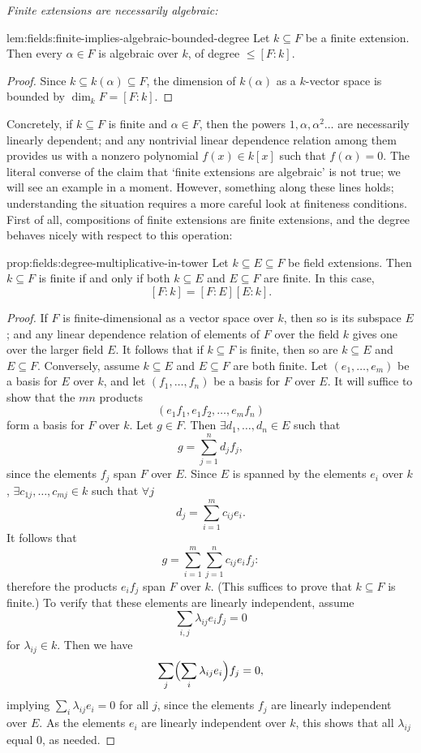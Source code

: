 \emph{Finite extensions are necessarily algebraic:}
\begin{lem}{}{lem:fields:finite-implies-algebraic-bounded-degree}
  Let $k \subseteq F$ be a finite extension. Then every $\alpha \in F$
  is algebraic over $k$, of degree $\leq [F : k]$.
\end{lem}
\begin{proof}
  Since $k \subseteq k(\alpha) \subseteq F$, the dimension of
  $k(\alpha)$ as a $k$-vector space is bounded by
  $\dim_k F = [F : k]$.
\end{proof}
Concretely, if $k \subseteq F$ is finite and $\alpha \in F$, then the
powers $1, \alpha, \alpha^2 \dots$ are necessarily linearly dependent;
and any nontrivial linear dependence relation among them provides us
with a nonzero polynomial $f(x) \in k[x]$ such that $f(\alpha) = 0$.
The literal converse of the claim that `finite extensions are
algebraic' is not true; we will see an example in a moment. However,
something along these lines holds; understanding the situation
requires a more careful look at finiteness conditions.  First of all,
compositions of finite extensions are finite extensions, and the
degree behaves nicely with respect to this operation:
\begin{prop}{}{prop:fields:degree-multiplicative-in-tower}
  Let $k \subseteq E \subseteq F$ be field extensions. Then
  $k \subseteq F$ is finite if and only if both $k \subseteq E$ and
  $E \subseteq F$ are finite.  In this case,
  \[ [F : k] = [F : E][E : k].
  \]
\end{prop}
\begin{proof}
  If $F$ is finite-dimensional as a vector space over $k$, then so is
  its subspace $E$; and any linear dependence relation of elements of
  $F$ over the field $k$ gives one over the larger field $E$. It
  follows that if $k \subseteq F$ is finite, then so are
  $k \subseteq E$ and $E \subseteq F$.  Conversely, assume
  $k \subseteq E$ and $E \subseteq F$ are both finite. Let
  $(e_1, \dots, e_m)$ be a basis for $E$ over $k$, and let
  $(f_1, \dots, f_n)$ be a basis for $F$ over $E$. It will suffice to
  show that the $mn$ products
  \[
    (e_1 f_1, e_1 f_2, \dots, e_m f_n)
  \]
  form a basis for $F$ over $k$.  Let $g \in F$. Then
  $\exists d_1, \dots, d_n \in E$ such that
  \[
    g = \sum_{j=1}^{n} d_j f_j,
  \]
  since the elements $f_j$ span $F$ over $E$. Since $E$ is spanned by
  the elements $e_i$ over $k$, $\exists c_{1j}, \dots, c_{mj} \in k$
  such that $\forall j$
  \[
    d_j = \sum_{i=1}^{m} c_{ij} e_i.
  \]
  It follows that
  \[
    g = \sum_{i=1}^{m} \sum_{j=1}^{n} c_{ij} e_i f_j:
  \]
  therefore the products $e_i f_j$ span $F$ over $k$. (This suffices
  to prove that $k \subseteq F$ is finite.)  To verify that these
  elements are linearly independent, assume
  \[
    \sum_{i,j} \lambda_{ij} e_i f_j = 0
  \]
  for $\lambda_{ij} \in k$. Then we have
  \[
    \sum_{j} \Bigl(\sum_{i} \lambda_{ij} e_i\Bigr) f_j = 0,
  \]
  implying $\sum_i \lambda_{ij} e_i = 0$ for all $j$, since the
  elements $f_j$ are linearly independent over $E$. As the elements
  $e_i$ are linearly independent over $k$, this shows that all
  $\lambda_{ij}$ equal $0$, as needed.
\end{proof}
